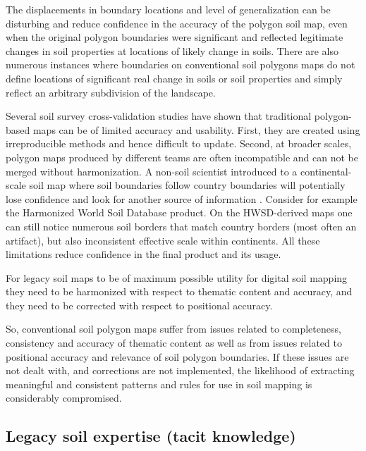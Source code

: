 \documentclass[graybox,natbib,nospthms,UStrade]{svmono}
\let\BeginKnitrBlock\begin \let\EndKnitrBlock\end
\let\BeginKnitrBlock\begin \let\EndKnitrBlock\end
\begin{document}
The displacements in boundary locations and level of generalization can
be disturbing and reduce confidence in the accuracy of the polygon soil
map, even when the original polygon boundaries were significant and
reflected legitimate changes in soil properties at locations of likely
change in soils. There are also numerous instances where boundaries on
conventional soil polygons maps do not define locations of significant
real change in soils or soil properties and simply reflect an arbitrary
subdivision of the landscape.

Several soil survey cross-validation studies
\citep{Marsman1986ALTERRA, Hengl2006SSSAJ} have shown that traditional
polygon-based maps can be of limited accuracy and usability. First, they
are created using irreproducible methods and hence difficult to update.
Second, at broader scales, polygon maps produced by different teams are
often incompatible and can not be merged without harmonization. A
non-soil scientist introduced to a continental-scale soil map where soil
boundaries follow country boundaries will potentially lose confidence and
look for another source of information \citep{DAvello1998SSH}. Consider for
example the Harmonized World Soil Database product. On the HWSD-derived
maps one can still notice numerous soil borders that match country
borders (most often an artifact), but also inconsistent effective scale
within continents. All these limitations reduce confidence in the final
product and its usage.

\BeginKnitrBlock{rmdnote}
For legacy soil maps to be of maximum
possible utility for digital soil mapping they need to be harmonized
with respect to thematic content and accuracy, and they need to be
corrected with respect to positional accuracy.
\EndKnitrBlock{rmdnote}

So, conventional soil polygon maps suffer from issues related to
completeness, consistency and accuracy of thematic content as well as
from issues related to positional accuracy and relevance of soil polygon
boundaries. If these issues are not dealt with, and corrections are not
implemented, the likelihood of extracting meaningful and consistent
patterns and rules for use in soil mapping is considerably compromised.

\hypertarget{tacit-knowledge}{%
\subsection{Legacy soil expertise (tacit knowledge)}\label{tacit-knowledge}}
\end{document}
